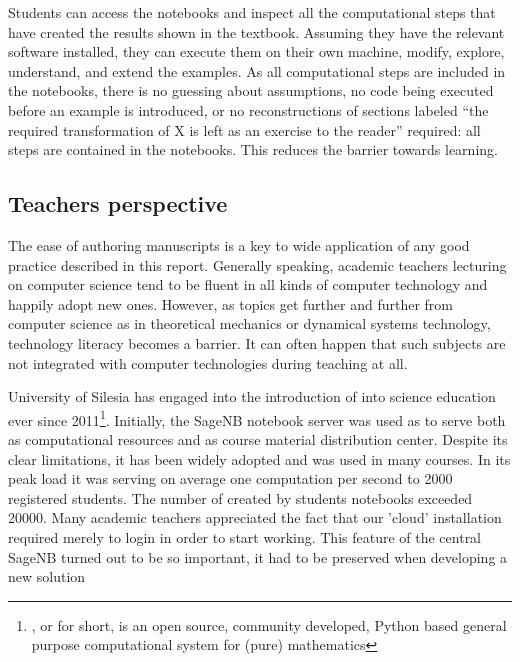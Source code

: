 \documentclass{deliverablereport}
\newcommand{\sagenb}{SageNB\xspace}
\begin{document}
Students can access the notebooks and inspect all the computational
steps that have created the results shown in the textbook. Assuming
they have the relevant software installed, they can execute them on
their own machine, modify, explore, understand, and extend the
examples. As all computational steps are included in the notebooks,
there is no guessing about assumptions, no code being executed before
an example is introduced, or no reconstructions of sections labeled
``the required transformation of X is left as an exercise to the
reader'' required: all steps are contained in the notebooks. This
reduces the barrier towards learning.



\subsection{Teachers perspective}

The ease of authoring manuscripts is a key to wide application of any
good practice described in this report. Generally speaking, academic
teachers lecturing on computer science tend to be fluent in all kinds
of computer technology and happily adopt new ones. However, as topics
get further and further from computer science as in theoretical
mechanics or dynamical systems technology, technology literacy becomes
a barrier. It can often happen that such subjects are not integrated
with computer technologies during teaching at all.


University of Silesia has engaged into the introduction of \SageMath
into science education ever since 2011\footnote{\SageMath, or \Sage
  for short, is an open source, community developed, Python based
  general purpose computational system for (pure) mathematics}.
Initially, the \sagenb notebook server was
used as to serve both as computational resources and as course
material distribution center. Despite its clear limitations, it has
been widely adopted and was used in many courses. In its peak load it
was serving on average one computation per second to 2000 registered
students. The number of created by students notebooks exceeded
20000. Many academic teachers appreciated the fact that our 'cloud'
installation required merely to login in order to start working. This
feature of the central \sagenb turned out to be so important, it had to
be preserved when developing a new solution
\end{document}
